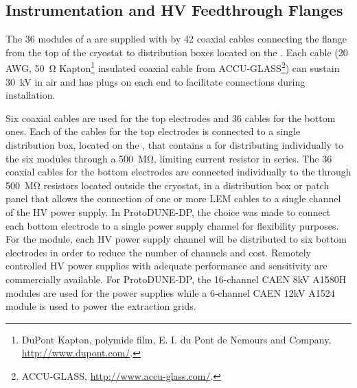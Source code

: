 \subsection{Instrumentation and HV Feedthrough Flanges}
\label{sec:dp-crp-intfc-FT}

The \num{36}  modules of a  are supplied with  by \num{42} coaxial cables 
connecting the \fdth flange from the top of the cryostat to distribution boxes located on the . Each cable (\num{20}\,AWG, \SI{50}{\ohm} Kapton\footnote{DuPont\texttrademark{} Kapton, polymide film,  E. I. du Pont de Nemours and Company,  \url{http://www.dupont.com/}.} insulated coaxial cable from ACCU-GLASS\footnote{ACCU-GLASS\texttrademark{}, \url{http://www.accu-glass.com/}.}) can sustain \SI{30}{kV} in air and has  plugs on each end to facilitate connections during  installation.

Six coaxial cables are used for the top  electrodes and \num{36} cables for the bottom ones. Each of the cables for the top  electrodes is connected to a single distribution box, located on the , that contains a  for distributing  individually to the six  modules through a \SI{500}{\mega\ohm}, limiting current resistor in series. The \num{36} coaxial cables for the bottom  electrodes are connected individually to the  through \SI{500}{\mega\ohm} resistors located outside the cryostat, in a distribution box or patch panel that allows the connection of one or more LEM cables to a single channel of the HV power supply. In ProtoDUNE-DP, the choice was made to connect each  bottom electrode to a single power supply channel for flexibility purposes. For the 
module, each HV power supply channel will be distributed to six bottom electrodes in order to reduce the number of channels and cost. Remotely controlled HV power supplies with adequate performance and sensitivity are commercially available.
For ProtoDUNE-DP, the 16-channel CAEN 8kV A1580H modules are 
used for the  power supplies while a 6-channel CAEN 12kV A1524 module is used to power the extraction grids.  

